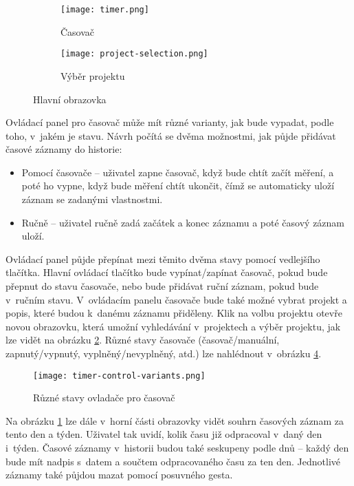 \begin{figure}[h]
    \centering
    \begin{subfigure}[b]{0.4\textwidth}
		\centering
		\texttt{[image: timer.png]}
		\caption{Časovač}
		\label{fig:timer}
	\end{subfigure}
	\hspace{2cm}
	\begin{subfigure}[b]{0.4\textwidth}
		\centering
		\texttt{[image: project-selection.png]}
		\caption{Výběr projektu}
		\label{fig:project-selection}
	\end{subfigure}
	\caption{Hlavní obrazovka}
	\label{fig:timer-and-project-selection}
\end{figure}

Ovládací panel pro časovač může mít různé varianty, jak bude vypadat, podle toho, v~jakém je stavu. Návrh počítá se dvěma možnostmi, jak půjde přidávat časové záznamy do historie:
\begin{itemize}
\item Pomocí časovače – uživatel zapne časovač, když bude chtít začít měření, a poté ho vypne, když bude měření chtít ukončit, čímž se automaticky uloží záznam se zadanými vlastnostmi.
\item Ručně – uživatel ručně zadá začátek a konec záznamu a poté časový záznam uloží.
\end{itemize}
Ovládací panel půjde přepínat mezi těmito dvěma stavy pomocí vedlejšího tlačítka. Hlavní ovládací tlačítko bude vypínat/zapínat časovač, pokud bude přepnut do stavu časovače, nebo bude přidávat ruční záznam, pokud bude v~ručním stavu. V~ovládacím panelu časovače bude také možné vybrat projekt a popis, které budou k~danému záznamu přiděleny. Klik na volbu projektu otevře novou obrazovku, která umožní vyhledávání v~projektech a výběr projektu, jak lze vidět na obrázku \ref{fig:project-selection}. Různé stavy časovače (časovač/manuální, zapnutý/vypnutý, vyplněný/nevyplněný, atd.) lze nahlédnout v~obrázku \ref{fig:timer-control-variants}.

\begin{figure}[h]
	\centering
	\texttt{[image: timer-control-variants.png]}
	\caption{Různé stavy ovladače pro časovač}
	\label{fig:timer-control-variants}
\end{figure}

Na obrázku \ref{fig:timer} lze dále v~horní části obrazovky vidět souhrn časových záznam za tento den a týden. Uživatel tak uvidí, kolik času již odpracoval v~daný den i~týden. Časové záznamy v~historii budou také seskupeny podle dnů – každý den bude mít nadpis s~datem a součtem odpracovaného času za ten den. Jednotlivé záznamy také půjdou mazat pomocí posuvného gesta.

